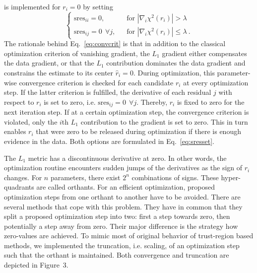 \documentclass{bioinfo}
\begin{document}
is implemented for $r_i=0$ by setting
\begin{equation}
	\begin{cases}
	\text{sres}_{ii}=0,& \text{ for } |\nabla_i \chi^2(r_i)| > \lambda\\
	\text{sres}_{ij}=0\:\:\forall j, \:\:& \text{ for } |\nabla_i \chi^2(r_i)| \le \lambda \:.
	\end{cases}
	\label{eq:sresset}
\end{equation}
The rationale behind Eq.~\ref{eq:convcrit} is that in addition to the classical optimization criterion of vanishing gradient, the $L_1$ gradient either compensates the data gradient, or that the $L_1$ contribution dominates the data gradient and constrains the estimate to its center $\hat r_i=0$.
During optimization, this parameter-wise convergence criterion is checked for each candidate $r_i$ at every optimization step.
If the latter criterion is fulfilled, the derivative of each residual $j$ with respect to $r_i$ is set to zero, i.e. $\text{sres}_{ij}=0\:\:\forall j$.
Thereby, $r_i$ is fixed to zero for the next iteration step.
If at a certain optimization step, the convergence criterion is violated, only the $i$th $L_1$ contribution to the gradient is set to zero.
This in turn enables $r_i$ that were zero to be released during optimization if there is enough evidence in the data.
Both options are formulated in Eq.~\ref{eq:sresset}.

The $L_1$ metric has a discontinuous derivative at zero.
In other words, the optimization routine encounters sudden jumps of the derivatives as the sign of $r_i$ changes.
For $n$ parameters, there exist $2^n$ combinations of signs.
These hyper-quadrants are called orthants.
For an efficient optimization, proposed optimization steps from one orthant to another have to be avoided.
There are several methods that cope with this problem.
They have in common that they split a proposed optimization step into two:
first a step towards zero, then potentially a step away from zero.
Their major difference is the strategy how zero-values are achieved.
To mimic most of original behavior of trust-region based methods, we implemented the truncation, i.e. scaling, of an optimization step such that the orthant is maintained.
Both convergence and truncation are depicted in Figure~3\vphantom{\ref{fig:03}}.
\end{document}
